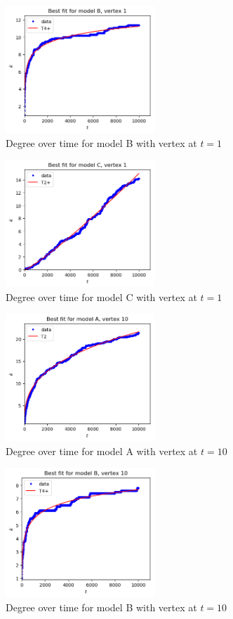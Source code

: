 \documentclass[a4paper]{article}
\begin{document}
%
\begin{figure}[H]
    \centering
		\includegraphics[width=0.5\textwidth]{modelB/best_dt1.png}
		\caption{Degree over time for model B with vertex at $t=1$}
\end{figure}
%
\begin{figure}[H]
		\centering
		\includegraphics[width=0.5\textwidth]{modelC/best_dt1.png}
		\caption{Degree over time for model C with vertex at $t=1$}
\end{figure}
%
\begin{figure}[H]
    \centering
		\includegraphics[width=0.5\textwidth]{modelA/best_dt10.png}
		\caption{Degree over time for model A with vertex at $t=10$}
\end{figure}
%
\begin{figure}[H]
    \centering
		\includegraphics[width=0.5\textwidth]{modelB/best_dt10.png}
		\caption{Degree over time for model B with vertex at $t=10$}
		\label{fig:dt_B_1}
\end{figure}
\end{document}
